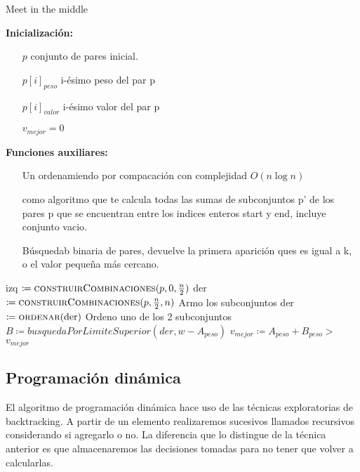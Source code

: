 \documentclass[fleqn, 11pt]{article}
\def\is{\coloneqq}
\begin{document}
\begin{algorithm}
\caption{Meet in the middle}
\begin{algorithmic}[1]
\item[\textbf{Inicialización:}]
\item[] \begin{itemize}
	\item[] $p$ conjunto de pares inicial.
	\item[] $p[i]_{peso}$ i-ésimo peso del par p
	\item[] $p[i]_{valor}$ i-ésimo valor del par p
	\item[] $v_{mejor} = 0$
\end{itemize}
\item[\textbf{Funciones auxiliares:}]
\item[] \begin{itemize}
	\item[]  Un ordenamiendo por compacación con
	complejidad $O(n\log n)$

	\item[]  como algoritmo
	que te calcula todas las sumas de subconjuntos p' de los pares p que se
	encuentran entre los indices enteros start y end, incluye conjunto
	vacio.

	\item[]  Búsquedab binaria de
	pares, devuelve la primera aparición ques es igual a k, o el valor
	pequeña más cercano.
\end{itemize}
\Statex
{}
\State izq $\is \Call{construirCombinaciones}{p, 0, \frac{n}{2}}$
\State der $\is \Call{construirCombinaciones}{p, \frac{n}{2}, n}$
\Comment Armo los subconjuntos
\State der $\is \Call{ordenar}{\text{der}}$
\Comment Ordeno uno de los 2 subconjuntos
	\State $B \is busquedaPorLimiteSuperior(der, w - A_{peso})$
			\State  $v_{mejor} \is A_{peso} + B_{peso} > $
		\EndIf
	\EndIf
\EndFor
\State \Return $v_{mejor}$
\EndFunction
\end{algorithmic}
\end{algorithm}

\subsection{Programación dinámica}

El algoritmo de programación dinámica hace uso de las técnicas
exploratorias de backtracking. A partir de un elemento realizaremos
sucesivos llamados recursivos considerando si agregarlo o no. La diferencia que
lo distingue de la técnica anterior es que almacenaremos las decisiones tomadas
para no tener que volver a calcularlas.
\end{document}
